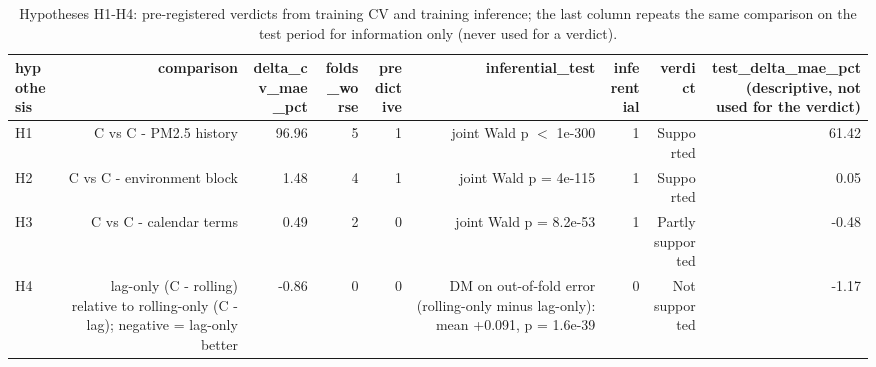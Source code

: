 \begin{table}[t]
\centering
\small
\caption{Hypotheses H1-H4: pre-registered verdicts from training CV and training inference; the last column repeats the same comparison on the test period for information only (never used for a verdict).}
\label{tab:table_S17_hypothesis_verdicts}
\begin{tabular}{lrrrrrrrr}
\toprule
hypothesis & comparison & delta\_cv\_mae\_pct & folds\_worse & predictive & inferential\_test & inferential & verdict & test\_delta\_mae\_pct (descriptive, not used for the verdict) \\
\midrule
H1 & C vs C - PM2.5 history & 96.96 & 5 & 1 & joint Wald p $<$ 1e-300 & 1 & Supported & 61.42 \\
H2 & C vs C - environment block & 1.48 & 4 & 1 & joint Wald p = 4e-115 & 1 & Supported & 0.05 \\
H3 & C vs C - calendar terms & 0.49 & 2 & 0 & joint Wald p = 8.2e-53 & 1 & Partly supported & -0.48 \\
H4 & lag-only (C - rolling) relative to rolling-only (C - lag); negative = lag-only better & -0.86 & 0 & 0 & DM on out-of-fold \textbar{}error\textbar{} (rolling-only minus lag-only): mean +0.091, p = 1.6e-39 & 0 & Not supported & -1.17 \\
\bottomrule
\end{tabular}
\end{table}
